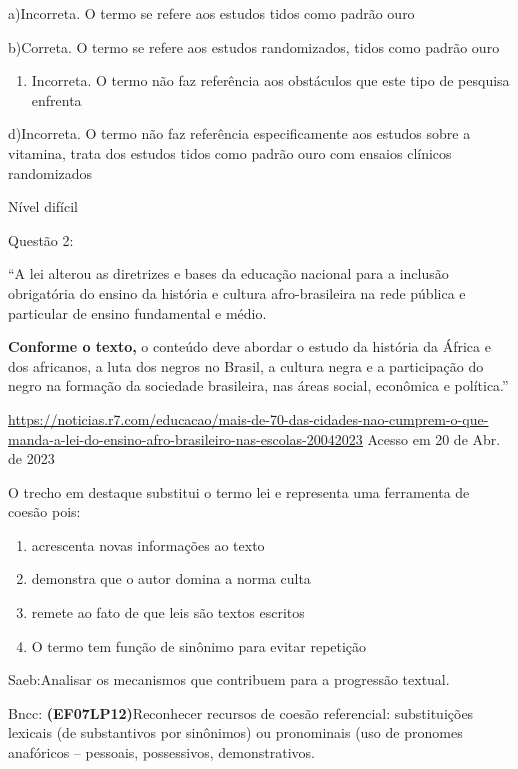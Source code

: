 {a)Incorreta. O termo se refere aos estudos tidos como padrão ouro

b)Correta. O termo se refere aos estudos randomizados, tidos como padrão
ouro

\begin{enumerate}
\def\labelenumi{\arabic{enumi}.}
\tightlist
\item
  Incorreta. O termo não faz referência aos obstáculos que este tipo de
  pesquisa enfrenta
\end{enumerate}

d)Incorreta. O termo não faz referência especificamente aos estudos
sobre a vitamina, trata dos estudos tidos como padrão ouro com ensaios
clínicos randomizados

Nível difícil

Questão 2:

``A lei alterou as diretrizes e bases da educação nacional para a
inclusão obrigatória do ensino da história e cultura afro-brasileira na
rede pública e particular de ensino fundamental e médio.

\textbf{Conforme o texto,} o conteúdo deve abordar o estudo da história
da África e dos africanos, a luta dos negros no Brasil, a cultura negra
e a participação do negro na formação da sociedade brasileira, nas áreas
social, econômica e política.''

\href{https://noticias.r7.com/educacao/mais-de-70-das-cidades-nao-cumprem-o-que-manda-a-lei-do-ensino-afro-brasileiro-nas-escolas-20042023}{\uline{https://noticias.r7.com/educacao/mais-de-70-das-cidades-nao-cumprem-o-que-manda-a-lei-do-ensino-afro-brasileiro-nas-escolas-20042023}}
Acesso em 20 de Abr. de 2023

O trecho em destaque substitui o termo lei e representa uma ferramenta
de coesão pois:

\begin{enumerate}
\def\labelenumi{\alph{enumi})}
\item
  acrescenta novas informações ao texto
\item
  demonstra que o autor domina a norma culta
\item
  remete ao fato de que leis são textos escritos
\item
  O termo tem função de sinônimo para evitar repetição
\end{enumerate}

Saeb:Analisar os mecanismos que contribuem para a progressão textual.

Bncc: \textbf{(EF07LP12)}Reconhecer recursos de coesão referencial:
substituições lexicais (de substantivos por sinônimos) ou pronominais
(uso de pronomes anafóricos -- pessoais, possessivos, demonstrativos.

}
